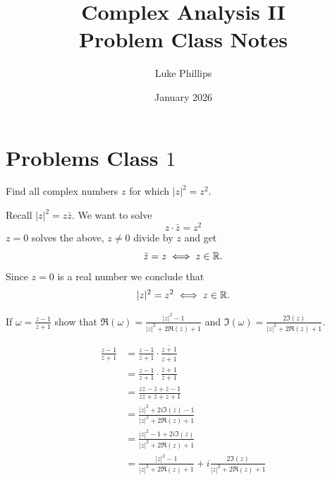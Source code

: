 \documentclass[10pt, a4paper]{article}
\title{Complex Analysis II \\
    \large Problem Class Notes}
\author{Luke Phillips}
\date{January 2026}
\begin{document}
\maketitle

\newpage

\tableofcontents

\newpage

\section{Problems Class \texorpdfstring{$1$}{}}

\begin{problem}
    Find all complex numbers $z$ for which $|z| ^ 2 = z ^ 2$.

    \begin{solution}
        Recall $|z| ^ 2 = z\bar{z}$.
        We want to solve
        \[
        z \cdot \bar{z} = z ^ 2
        \]
        $z = 0$ solves the above,
        $z \neq 0$ divide by $z$ and get
        \[
        \bar{z} = z \iff z \in \mathbb{R}.
        \]
        Since $z = 0$ is a real number we conclude that
        \[
        |z| ^ 2 = z ^ 2 \iff z \in \mathbb{R}.
        \]
    \end{solution}
\end{problem}

\begin{problem}
    If $\omega = \frac{z - 1}{z + 1}$ show that $\Re(\omega) = \frac{|z| ^ 2 - 1}{|z| ^ 2 + 2\Re(z) + 1}$ and $\Im(\omega) = \frac{2\Im(z)}{|z| ^ 2 + 2\Re(z) + 1}$.

    \begin{solution}
        \begin{align*}
            \frac{z - 1}{z + 1} &= \frac{z - 1}{z + 1}\cdot\frac{\overline{z + 1}}{\overline{z + 1}} \\
            &= \frac{z - 1}{z + 1}\cdot\frac{\bar{z} + 1}{\bar{z} + 1} \\
            &= \frac{z\bar{z} - \bar{z} + \bar{z} - 1}{z\bar{z} + \bar{z} + z + 1} \\
            &= \frac{|z| ^ 2 + 2i\Im(z) - 1}{|z| ^ 2 + 2\Re(z) + 1} \\
            &= \frac{|z| ^ 2 - 1 + 2i\Im(z)}{|z| ^ 2 + 2\Re(z) + 1} \\
            &= \frac{|z| ^ 2 - 1}{|z| ^ 2 + 2\Re(z) + 1} + i\frac{2\Im(z)}{|z| ^ 2 + 2\Re(z) + 1}
        \end{align*}
    \end{solution}
\end{problem}
\end{document}
